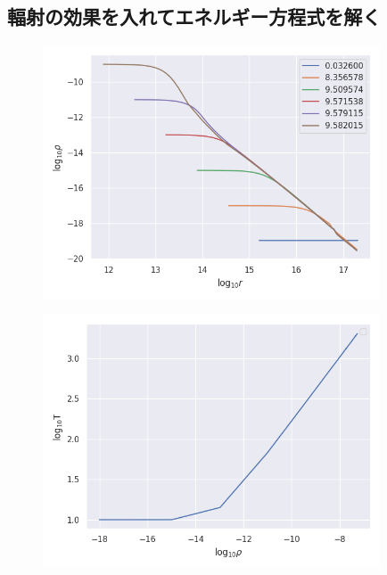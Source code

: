 \documentclass[a4j, dvipdfmx]{jsarticle}
\begin{document}
\subsection{輻射の効果を入れてエネルギー方程式を解く}
\begin{figure}[H]
    \includegraphics[clip,width=10.0cm]{graph/rho_r_noion.png}
    \caption{}
    \label{fig:rho_r_noion}
\end{figure}
\begin{figure}[H]
    \includegraphics[clip,width=10.0cm]{graph/core_noion.png}
    \caption{}
    \label{fig:core_noion}
\end{figure}
\end{document}
